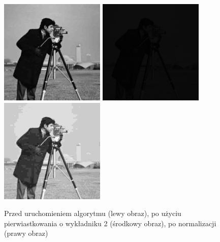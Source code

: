 \documentclass[a4paper,12pt]{book}
\begin{document}
\begin{figure}[H]
	\caption{Przed uruchomieniem algorytmu (lewy obraz), po użyciu pierwiastkowania o wykładniku 2 (środkowy obraz), po normalizacji (prawy obraz)}
	\includegraphics[width=5cm, height=5cm]{man-unmodified.jpg}
	\includegraphics[width=5cm, height=5cm]{2-6/root-gray-photoman-2.png}
	\includegraphics[width=5cm, height=5cm]{2-6/root-gray-photoman-2-norm.png}
\end{figure}
\end{document}
